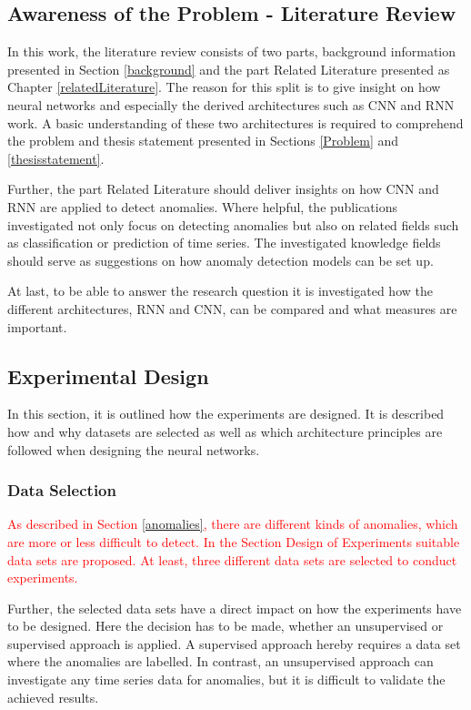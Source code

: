 \newpage
\subsection{Awareness of the Problem - Literature Review}
In this work, the literature review consists of two parts, background information presented in Section \ref{background} and the part Related Literature presented as Chapter \ref{relatedLiterature}. The reason for this split is to give insight on how neural networks and especially the derived architectures such as CNN and RNN work. A basic understanding of these two architectures is required to comprehend the problem and thesis statement presented in Sections \ref{Problem} and \ref{thesisstatement}. 

Further, the part Related Literature should deliver insights on how CNN and RNN are applied to detect anomalies. Where helpful, the publications investigated not only focus on detecting anomalies but also on related fields such as classification or prediction of time series. The investigated knowledge fields should serve as suggestions on how anomaly detection models can be set up. 

At last, to be able to answer the research question it is investigated how the different architectures, RNN and CNN, can be compared and what measures are important. 

\subsection{Experimental Design}
In this section, it is outlined how the experiments are designed. It is described how and why datasets are selected as well as which architecture principles are followed when designing the neural networks.

\subsubsection{Data Selection}
\textcolor{red}{
As described in Section \ref{anomalies}, there are different kinds of anomalies, which are more or less difficult to detect. In the Section Design of Experiments suitable data sets are proposed. At least, three different data sets are selected to conduct experiments.}
 
Further, the selected data sets have a direct impact on how the experiments have to be designed. Here the decision has to be made, whether an unsupervised or supervised approach is applied. A supervised approach hereby requires a data set where the anomalies are labelled. In contrast, an unsupervised approach can investigate any time series data for anomalies, but it is difficult to validate the achieved results.

